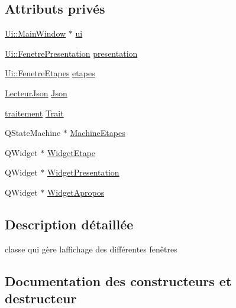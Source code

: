 \subsection*{Attributs privés}
\begin{DoxyCompactItemize}
\item 
\hyperlink{class_ui_1_1_main_window}{Ui\+::\+Main\+Window} $\ast$ \hyperlink{class_main_window_a35466a70ed47252a0191168126a352a5}{ui}
\item 
\hyperlink{class_ui_1_1_fenetre_presentation}{Ui\+::\+Fenetre\+Presentation} \hyperlink{class_main_window_a12b3703287f602303f92ced702c2b88f}{presentation}
\item 
\hyperlink{class_ui_1_1_fenetre_etapes}{Ui\+::\+Fenetre\+Etapes} \hyperlink{class_main_window_aee806e7be315f0cc67e8e7cd19f7d651}{etapes}
\item 
\hyperlink{class_lecteur_json}{Lecteur\+Json} \hyperlink{class_main_window_a9db0843494679d79521b63ca3b6f3f7e}{Json}
\item 
\hyperlink{classtraitement}{traitement} \hyperlink{class_main_window_a1dfb1b1b22d99fccae16abadec84523f}{Trait}
\item 
Q\+State\+Machine $\ast$ \hyperlink{class_main_window_ae4e608b1c0ba194f1e1a1e09905182e2}{Machine\+Etapes}
\item 
Q\+Widget $\ast$ \hyperlink{class_main_window_a8463ff15a4d0c60daf94ef4555710e9b}{Widget\+Etape}
\item 
Q\+Widget $\ast$ \hyperlink{class_main_window_af897497296009c9ed94c40d7785bb847}{Widget\+Presentation}
\item 
Q\+Widget $\ast$ \hyperlink{class_main_window_a8a1bf5356fafc93d0b6560427fd022e2}{Widget\+Apropos}
\end{DoxyCompactItemize}


\subsection{Description détaillée}
classe qui gère l\textquotesingle{}affichage des différentes fenêtres 

\subsection{Documentation des constructeurs et destructeur}
\mbox{\label{class_main_window_a996c5a2b6f77944776856f08ec30858d}} 
